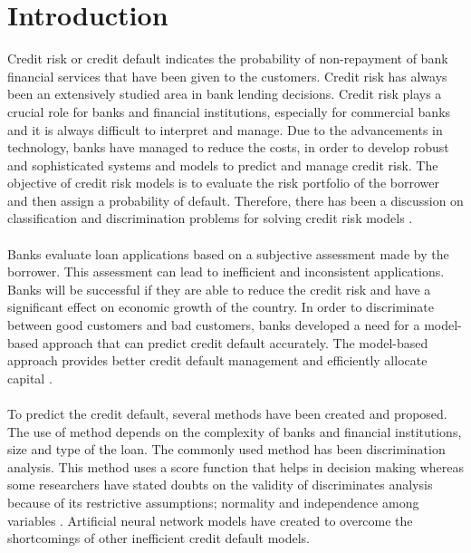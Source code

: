 \documentclass{article}[]
\begin{document}
\section{Introduction}
\label{intro}
Credit risk or credit default indicates the probability of non-repayment of bank financial services that have been given to the customers. Credit risk has always been an extensively studied area in bank lending decisions. Credit risk plays a crucial role for banks and financial institutions, especially for commercial banks and it is always difficult to interpret and manage. Due to the advancements in technology, banks have managed to reduce the costs, in order to develop robust and sophisticated systems and models to predict and manage credit risk.
The objective of credit risk models is to evaluate the risk portfolio of the borrower and then assign a probability of default. Therefore, there has been a discussion on classification and discrimination problems for solving credit risk models \cite{pacelli2011artificial}. \\\\
Banks evaluate loan applications based on a subjective assessment made by the borrower. This assessment can lead to inefficient and inconsistent applications. Banks will be successful if they are able to reduce the credit risk and have a significant effect on economic growth of the country. In order to discriminate between good customers and bad customers, banks developed a need for a model-based approach that can predict credit default accurately. The model-based approach provides better credit default management and efficiently allocate capital \cite{angelini2008neural}. \\\\
To predict the credit default, several methods have been created and proposed. The use of method depends on the complexity of banks and financial institutions, size and type of the loan. The commonly used method has been discrimination analysis. This method uses a score function that helps in decision making whereas some researchers have stated doubts on the validity of discriminates analysis because of its restrictive assumptions; normality and independence among variables \cite{eisenbeis1977pitfalls}. Artificial neural network models have created to overcome the shortcomings of other inefficient credit default models.\\\\
\end{document}
